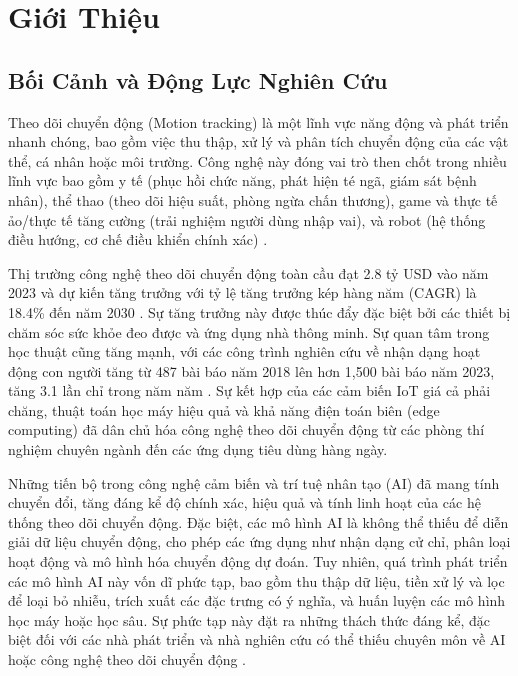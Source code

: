 \chapter{Giới Thiệu}
\label{chap:introduction}

\section{Bối Cảnh và Động Lực Nghiên Cứu}

Theo dõi chuyển động (Motion tracking) là một lĩnh vực năng động và phát triển nhanh chóng, bao gồm việc thu thập, xử lý và phân tích chuyển động của các vật thể, cá nhân hoặc môi trường. Công nghệ này đóng vai trò then chốt trong nhiều lĩnh vực bao gồm y tế (phục hồi chức năng, phát hiện té ngã, giám sát bệnh nhân), thể thao (theo dõi hiệu suất, phòng ngừa chấn thương), game và thực tế ảo/thực tế tăng cường (trải nghiệm người dùng nhập vai), và robot (hệ thống điều hướng, cơ chế điều khiển chính xác) \cite{article:human_motion_tracking_survey}.

Thị trường công nghệ theo dõi chuyển động toàn cầu đạt 2.8 tỷ USD vào năm 2023 và dự kiến tăng trưởng với tỷ lệ tăng trưởng kép hàng năm (CAGR) là 18.4\% đến năm 2030 \cite{marketreport2023motion}. Sự tăng trưởng này được thúc đẩy đặc biệt bởi các thiết bị chăm sóc sức khỏe đeo được và ứng dụng nhà thông minh. Sự quan tâm trong học thuật cũng tăng mạnh, với các công trình nghiên cứu về nhận dạng hoạt động con người tăng từ 487 bài báo năm 2018 lên hơn 1,500 bài báo năm 2023, tăng 3.1 lần chỉ trong năm năm \cite{wang2024har_comparative}. Sự kết hợp của các cảm biến IoT giá cả phải chăng, thuật toán học máy hiệu quả và khả năng điện toán biên (edge computing) đã dân chủ hóa công nghệ theo dõi chuyển động từ các phòng thí nghiệm chuyên ngành đến các ứng dụng tiêu dùng hàng ngày.

Những tiến bộ trong công nghệ cảm biến và trí tuệ nhân tạo (AI) đã mang tính chuyển đổi, tăng đáng kể độ chính xác, hiệu quả và tính linh hoạt của các hệ thống theo dõi chuyển động. Đặc biệt, các mô hình AI là không thể thiếu để diễn giải dữ liệu chuyển động, cho phép các ứng dụng như nhận dạng cử chỉ, phân loại hoạt động và mô hình hóa chuyển động dự đoán. Tuy nhiên, quá trình phát triển các mô hình AI này vốn dĩ phức tạp, bao gồm thu thập dữ liệu, tiền xử lý và lọc để loại bỏ nhiễu, trích xuất các đặc trưng có ý nghĩa, và huấn luyện các mô hình học máy hoặc học sâu. Sự phức tạp này đặt ra những thách thức đáng kể, đặc biệt đối với các nhà phát triển và nhà nghiên cứu có thể thiếu chuyên môn về AI hoặc công nghệ theo dõi chuyển động \cite{article:motion_tracking_using_AI}.


